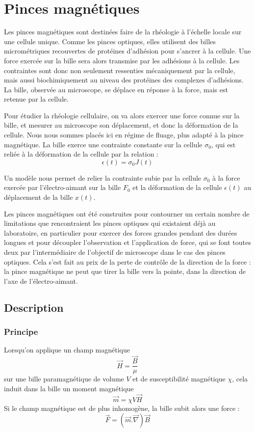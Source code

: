 \section{Pinces magnétiques}

Les pinces magnétiques sont destinées faire de la rhéologie à l'échelle locale sur une cellule unique. Comme les pinces optiques, elles utilisent des billes micrométriques recouvertes de protéines d'adhésion pour s'ancrer à la cellule. 
Une force exercée sur la bille sera alors transmise par les adhésions à la cellule.
 Les contraintes sont donc non seulement ressenties mécaniquement par la cellule, mais aussi biochimiquement au niveau des protéines des complexes d'adhésions. 
La bille, observée au microscope, se déplace en réponse à la force, mais est retenue par la cellule.

Pour étudier la rhéologie cellulaire, on va alors exercer une force connue sur la bille, et mesurer au microscope son déplacement, et donc la déformation de la cellule.
Nous nous sommes placés ici en régime de fluage, plus adapté à la pince magnétique. La bille exerce une contrainte constante sur la cellule $\sigma_0$, qui est reliée à la déformation de la cellule par la relation : 
$$\epsilon (t) = \sigma_0 J(t)$$

Un modèle nous permet de relier la contrainte subie par la cellule $\sigma_0$ à la force exercée par l'électro-aimant sur la bille $F_0$ et la déformation de la cellule $\epsilon (t)$ au déplacement de la bille $x(t)$. 






Les pinces magnétiques ont été construites pour contourner un certain nombre de limitations que rencontraient les pinces optiques qui existaient déjà au laboratoire, en particulier pour exercer des forces grandes pendant des durées longues et pour découpler l'observation et l'application de force, qui se font toutes deux par l'intermédiaire de l'objectif de microscope dans le cas des pinces optiques. Cela s'est fait au prix de la perte de contrôle de la direction de la force : la pince magnétique ne peut que tirer la bille vers la pointe, dans la direction de l'axe de l'électro-aimant. 


	\subsection{Description}
		\subsubsection{Principe}
		Lorsqu'on applique un champ magnétique $$\vec{H} = \frac{\vec{B}}{\mu}$$ sur une bille paramagnétique de volume $V$ et de susceptibilité magnétique $\chi$, cela induit dans la bille un moment magnétique $$\vec{m} = \chi V \vec{H}$$ Si le champ magnétique est de plus inhomogène, la bille subit alors une force :$$\vec{F} = \left( \vec{m}. \vec{\nabla} \right) \vec{B}$$
	
